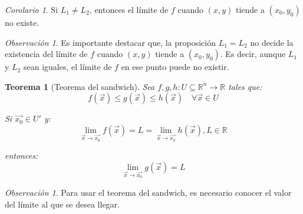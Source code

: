 \documentclass{article}
\newcommand{\R}{\mathbb{R}}
\newcommand{\vect}[1]{\vec{#1}}
\theoremstyle{definition}
\theoremstyle{plain}
\newtheorem{theorem}[definition]{Teorema}
\theoremstyle{remark}
\newtheorem{remark}[definition]{Observación}
\theoremstyle{corollary}
\newtheorem{corollary}[definition]{Corolario}
\begin{document}
\begin{corollary}
Si $L_1 \neq L_2$, entonces el límite de $f$ cuando $(x, y)$ tiende a $(x_0, y_0)$ no existe.
\end{corollary}

\begin{remark}
Es importante destacar que, la proposición $L_1 = L_2$ no decide la existencia del límite de $f$ cuando $(x, y)$ tiende a $(x_0, y_0)$. Es decir, aunque $L_1$ y $L_2$ sean iguales, el límite de $f$ en ese punto puede no existir.
\end{remark}

\begin{theorem}[Teorema del sandwich]
Sea $f, g, h : U \subseteq \R^n \to \R$ tales que:
\[
f(\vect{x}) \leq g(\vect{x}) \leq h(\vect{x}) \quad \forall \vect{x} \in U
\]

Si $\vec{x_0} \in U'$ y:
\[
\lim_{\vect{x} \to \vect{x_0}} f(\vect{x}) = L = \lim_{\vect{x} \to \vect{x_0}} h(\vect{x}), L \in \R
\]

entonces:
\[
\lim_{\vect{x} \to \vect{x_0}} g(\vect{x}) = L
\]
\end{theorem}

\begin{remark}
Para usar el teorema del sandwich, es necesario conocer el valor del límite al que se desea llegar.
\end{remark}
\end{document}
